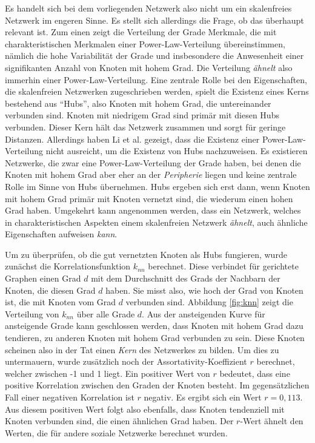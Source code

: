 Es handelt sich bei dem vorliegenden Netzwerk also nicht um ein
skalenfreies Netzwerk im engeren Sinne. Es stellt sich allerdings die
Frage, ob das \"uberhaupt relevant ist. Zum einen zeigt die Verteilung
der Grade Merkmale, die mit charakteristischen Merkmalen einer
Power-Law-Verteilung \"ubereinstimmen, n\"amlich die hohe
Variabilit\"at der Grade und insbesondere die Anwesenheit einer
signifikanten Anzahl von Knoten mit hohem Grad. Die Verteilung
\emph{\"ahnelt} also immerhin einer Power-Law-Verteilung. Eine
zentrale Rolle bei den Eigenschaften, die skalenfreien Netzwerken
zugeschrieben werden, spielt die Existenz eines Kerns bestehend aus
``Hubs'', also Knoten mit hohem Grad, die untereinander verbunden
sind. Knoten mit niedrigem Grad sind prim\"ar mit diesen Hubs
verbunden. Dieser Kern h\"alt das Netzwerk zusammen und sorgt f\"ur
geringe Distanzen. Allerdings haben Li et al. \cite{Li2005} gezeigt,
dass die Existenz einer Power-Law-Verteilung nicht ausreicht, um die
Existenz von Hubs nachzuweisen. Es existieren Netzwerke, die zwar eine
Power-Law-Verteilung der Grade haben, bei denen die Knoten mit hohem
Grad aber eher an der \emph{Peripherie} liegen und keine zentrale
Rolle im Sinne von Hubs \"ubernehmen.  Hubs ergeben sich erst dann,
wenn Knoten mit hohem Grad prim\"ar mit Knoten vernetzt sind, die
wiederum einen hohen Grad haben. Umgekehrt kann angenommen werden,
dass ein Netzwerk, welches in charakteristischen Aspekten einem
skalenfreien Netzwerk \emph{\"ahnelt}, auch \"ahnliche Eigenschaften
aufweisen \emph{kann}.

Um zu \"uberpr\"ufen, ob die gut vernetzten Knoten als Hubs fungieren,
wurde zun\"achst die Korrelationsfunktion $k_{nn}$
berechnet\cite{PhysRevLett.87.258701}. Diese verbindet f\"ur
gerichtete Graphen einen Grad $d$ mit dem Durchschnitt des Grads der
Nachbarn der Knoten, die diesen Grad $d$ haben. Sie misst also, wie
hoch der Grad von Knoten ist, die mit Knoten vom Grad $d$ verbunden
sind. Abbildung \ref{fig:knn} zeigt die Verteilung von $k_{nn}$ \"uber
alle Grade $d$. Aus der ansteigenden Kurve f\"ur ansteigende Grade
kann geschlossen werden, dass Knoten mit hohem Grad dazu tendieren, zu
anderen Knoten mit hohem Grad verbunden zu sein. Diese Knoten scheinen
also in der Tat einen \emph{Kern} des Netzwerkes zu bilden. Um dies zu
untermauern, wurde zus\"atzlich noch der Assortativity-Koeffizient $r$ \cite{PhysRevLett.89.208701}
berechnet, welcher zwischen -1 und 1 liegt. Ein positiver Wert von $r$
bedeutet, dass eine positive Korrelation zwischen den Graden der
Knoten besteht. Im gegens\"atzlichen Fall einer negativen Korrelation
ist $r$ negativ. Es ergibt sich ein Wert $r = 0,113$. Aus diesem positiven
Wert folgt also ebenfalls, dass Knoten tendenziell mit Knoten verbunden
sind, die einen \"ahnlichen Grad haben. Der $r$-Wert \"ahnelt den
Werten, die f\"ur andere soziale Netzwerke berechnet
wurden\cite{newman:167}.

